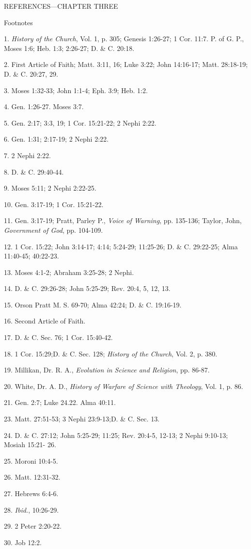 \newpage
REFERENCES—CHAPTER THREE

Footnotes

1. \textit{History of the Church}, Vol. 1, p. 305; Genesis 1:26-27; 1 Cor. 11:7. P. of G. P., Moses 1:6;
Heb. 1:3; 2:26-27; D. \& C. 20:18.

2. First Article of Faith; Matt. 3:11, 16; Luke 3:22; John 14:16-17; Matt. 28:18-19; D. \& C.
20:27, 29.

3. Moses 1:32-33; John 1:1-4; Eph. 3:9; Heb. 1:2.

4. Gen. 1:26-27. Moses 3:7.

5. Gen. 2:17; 3:3, 19; 1 Cor. 15:21-22; 2 Nephi 2:22.

6. Gen. 1:31; 2:17-19; 2 Nephi 2:22.

7. 2 Nephi 2:22.

8. D. \& C. 29:40-44.

9. Moses 5:11; 2 Nephi 2:22-25.

10. Gen. 3:17-19; 1 Cor. 15:21-22.

11. Gen. 3:17-19; Pratt, Parley P., \textit{Voice of Warning}, pp. 135-136; Taylor, John, \textit{Government
of God}, pp. 104-109.

12. 1 Cor. 15:22; John 3:14-17; 4:14; 5:24-29; 11:25-26; D. \& C. 29:22-25; Alma 11:40-45;
40:22-23.

13. Moses 4:1-2; Abraham 3:25-28; 2 Nephi.

14. D. \& C. 29:26-28; John 5:25-29; Rev. 20:4, 5, 12, 13.

15. Orson Pratt M. S. 69-70; Alma 42:24; D. \& C. 19:16-19.

16. Second Article of Faith.

17. D. \& C. Sec. 76; 1 Cor. 15:40-42.

18. 1 Cor. 15:29;D. \& C. Sec. 128; \textit{History of the Church}, Vol. 2, p. 380.

19. Millikan, Dr. R. A., \textit{Evolution in Science and Religion}, pp. 86-87.

20. White, Dr. A. D., \textit{History of Warfare of Science with Theology}, Vol. 1, p. 86.

21. Gen. 2:7; Luke 24.22. Alma 40:11.

23. Matt. 27:51-53; 3 Nephi 23:9-13;D. \& C. Sec. 13.

24. D. \& C. 27:12; John 5:25-29; 11:25; Rev. 20:4-5, 12-13; 2 Nephi 9:10-13; Mosiah 15:21-
26.

25. Moroni 10:4-5.

26. Matt. 12:31-32.

27. Hebrews 6:4-6.

28. \textit{Ibid.}, 10:26-29.

29. 2 Peter 2:20-22.

30. Job 12:2.

